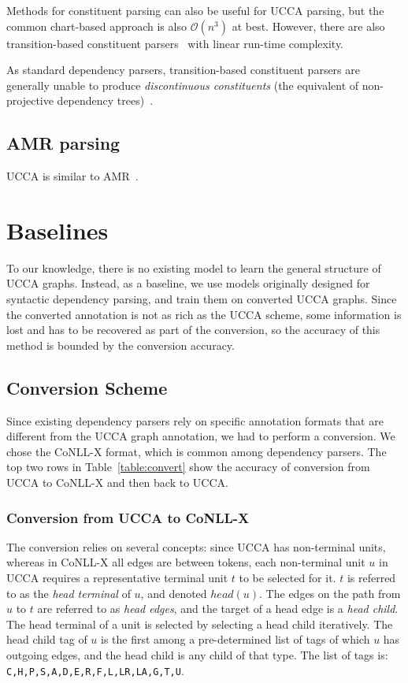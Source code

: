 \documentclass[11pt]{article}
\begin{document}
Methods for constituent parsing can also be useful for UCCA parsing, but the common chart-based approach is also $\mathcal{O}(n^3)$ at best. However, there are also transition-based constituent parsers~\cite{zhu2013fast} with linear run-time complexity.

As standard dependency parsers, transition-based constituent parsers are generally unable to produce \textit{discontinuous constituents} (the equivalent of non-projective dependency trees)~\cite{maier2015discontinuous}.

\subsection{AMR parsing}

UCCA is similar to AMR~\cite{flanigan2014discriminative,artzi2015broad}.

\section{Baselines}

To our knowledge, there is no existing model to learn the general structure of UCCA graphs. Instead, as a baseline, we use models originally designed for syntactic dependency parsing, and train them on converted UCCA graphs. Since the converted annotation is not as rich as the UCCA scheme, some information is lost and has to be recovered as part of the conversion, so the accuracy of this method is bounded by the conversion accuracy.

\subsection{Conversion Scheme}

Since existing dependency parsers rely on specific annotation formats that are different from the UCCA graph annotation, we had to perform a conversion. We chose the CoNLL-X format, which is common among dependency parsers.
The top two rows in Table~\ref{table:convert} show the accuracy of conversion from UCCA to CoNLL-X and then back to UCCA.

\subsubsection{Conversion from UCCA to CoNLL-X}

The conversion relies on several concepts: since UCCA has non-terminal units, whereas in CoNLL-X all edges are between tokens, each non-terminal unit $u$ in UCCA requires a representative terminal unit $t$ to be selected for it. $t$ is referred to as the \textit{head terminal} of $u$, and denoted $head(u)$. The edges on the path from $u$ to $t$ are referred to as \textit{head edges}, and the target of a head edge is a \textit{head child}. The head terminal of a unit is selected by selecting a head child iteratively. The head child tag of $u$ is the first among a pre-determined list of tags of which $u$ has outgoing edges, and the head child is any child of that type. The list of tags is: \texttt{C,H,P,S,A,D,E,R,F,L,LR,LA,G,T,U}.
\end{document}
